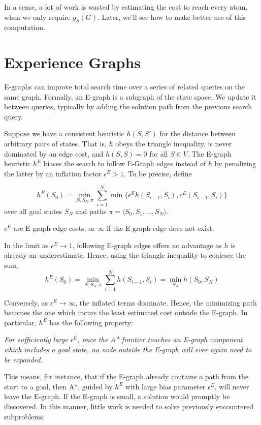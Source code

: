 \documentclass[letterpaper]{article}
\begin{document}
In a sense, a lot of work is wasted by estimating the cost to reach every atom, when we only require $g_S(G)$.
Later, we'll see how to make better use of this computation.

\section{Experience Graphs}

E-graphs can improve total search time over a series of related queries on the same graph.
Formally, an E-graph is a subgraph of the state space.
We update it between queries, typically by adding the solution path from the previous search query.

Suppose we have a consistent heuristic $h(S,S')$ for the distance between arbitrary pairs of states.
That is, $h$ obeys the triangle inequality, is never dominated by an edge cost, and $h(S,S) = 0$ for all $S\in V$.
The E-graph heuristic $h^E$ biases the search to follow E-Graph edges instead of $h$ by penalizing the latter by an inflation factor $\epsilon^E > 1$.
To be precise, define

\[h^E(S_0) = \min_{N,S_N,\pi} \sum_{i=1}^N \min \{\epsilon^E h(S_{i-1},S_i),c^E(S_{i-1},S_i)\}\]
over all goal states $S_N$ and paths $\pi = \langle S_0,S_1,...,S_N \rangle$.

$c^E$ are E-graph edge costs, or $\infty$ if the E-graph edge does not exist.

In the limit as $\epsilon^E \rightarrow 1$, following E-graph edges offers no advantage as $h$ is already an underestimate. Hence, using the triangle inequality to coalesce the sum,
\[h^E(S_0) = \min_{N,S_N,\pi} \sum_{i=1}^N h(S_{i-1},S_i) = \min_{S_N} h(S_0,S_N)\]

Conversely, as $\epsilon^E \rightarrow\infty$, the inflated terms dominate. Hence, the minimizing path becomes the one which incurs the least estimated cost outside the E-graph. In particular, $h^E$ has the following property:

\textit{For sufficiently large $\epsilon^E$, once the A* frontier touches an E-graph component which includes a goal state, no node outside the E-graph will ever again need to be expanded.}

This means, for instance, that if the E-graph already contains a path from the start to a goal, then A*, guided by $h^E$ with large bias parameter $\epsilon^E$, will never leave the E-graph.
If the E-graph is small, a solution would promptly be discovered.
In this manner, little work is needed to solve previously encountered subproblems.
\end{document}
